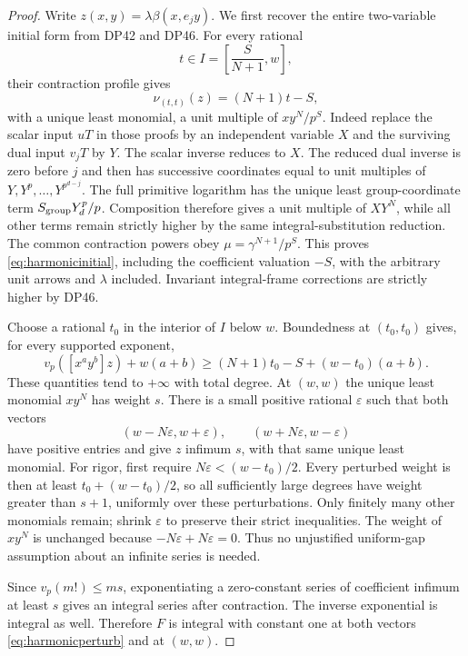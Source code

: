 \documentclass[11pt,a4paper]{article}
\theoremstyle{definition}\newtheorem{remark}[theorem]{Remark}
\newcommand{\vp}{v_p}\newcommand{\dR}{\mathrm{dR}}\newcommand{\crys}{\mathrm{crys}}
\begin{document}
\begin{proof}
Write $z(x,y)=\lambda\beta(x,e_jy)$.
We first recover the entire two-variable initial form from DP42 and DP46.
For every rational
\[
 t\in I=\left[\frac{S}{N+1},w\right],
\]
their contraction profile gives
\begin{equation}\label{eq:harmonicinitial}
 \nu_{(t,t)}(z)=(N+1)t-S,
\end{equation}
with a unique least monomial, a unit multiple of $xy^N/p^S$.
Indeed replace the scalar input $uT$ in those proofs by an independent variable $X$ and the surviving dual input $v_jT$ by $Y$.
The scalar inverse reduces to $X$.
The reduced dual inverse is zero before $j$ and then has successive coordinates equal to unit multiples of $Y,Y^p,\ldots,Y^{p^{d-j}}$.
The full primitive logarithm has the unique least group-coordinate term $S_{\rm group}Y_d^p/p$.
Composition therefore gives a unit multiple of $XY^N$, while all other terms remain strictly higher by the same integral-substitution reduction.
The common contraction powers obey $\mu=\gamma^{N+1}/p^S$.
This proves \eqref{eq:harmonicinitial}, including the coefficient valuation $-S$, with the arbitrary unit arrows and $\lambda$ included.
Invariant integral-frame corrections are strictly higher by DP46.

Choose a rational $t_0$ in the interior of $I$ below $w$.
Boundedness at $(t_0,t_0)$ gives, for every supported exponent,
\[
 \vp([x^ay^b]z)+w(a+b)
 \ge (N+1)t_0-S+(w-t_0)(a+b).
\]
These quantities tend to $+\infty$ with total degree.
At $(w,w)$ the unique least monomial $xy^N$ has weight $s$.
There is a small positive rational $\varepsilon$ such that both vectors
\begin{equation}\label{eq:harmonicperturb}
 (w-N\varepsilon,w+\varepsilon),\qquad
 (w+N\varepsilon,w-\varepsilon)
\end{equation}
have positive entries and give $z$ infimum $s$, with that same unique least monomial.
For rigor, first require $N\varepsilon<(w-t_0)/2$.
Every perturbed weight is then at least $t_0+(w-t_0)/2$, so all sufficiently large degrees have weight greater than $s+1$, uniformly over these perturbations.
Only finitely many other monomials remain; shrink $\varepsilon$ to preserve their strict inequalities.
The weight of $xy^N$ is unchanged because $-N\varepsilon+N\varepsilon=0$.
Thus no unjustified uniform-gap assumption about an infinite series is needed.

Since $\vp(m!)\le ms$, exponentiating a zero-constant series of coefficient infimum at least $s$ gives an integral series after contraction.
The inverse exponential is integral as well.
Therefore $F$ is integral with constant one at both vectors \eqref{eq:harmonicperturb} and at $(w,w)$.


\end{proof}
\end{document}
